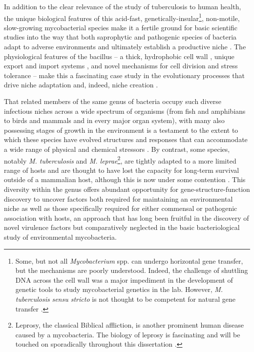 In addition to the clear relevance of the study of tuberculosis to human health, the unique biological features of this acid\hyp{}fast, genetically\hyp{}insular\footnote{Some, but not all \textit{Mycobacterium} spp. can undergo horizontal gene transfer, but the mechanisms are poorly understood. Indeed, the challenge of shuttling DNA across the cell wall was a major impediment in the development of genetic tools to study mycobacterial genetics in the lab. However, \textit{M. tuberculosis} \textit{sensu stricto} is not thought to be competent for natural gene transfer \citep{Madacki2021, Reva2015, Merker2015, Galagan2014, Boritsch2016, Derbyshire2014, Krzywinska2004}.}, non\hyp{}motile, slow\hyp{}growing mycobacterial species make it a fertile ground for basic scientific studies into the way that both saprophytic and pathogenic species of bacteria adapt to adverse environments and ultimately establish a productive niche \citep{Prasanthi2014, Falkinham2009, Ghodbane2014, Houben2006, Pieters2002, Delafont2014}. The physiological features of the bacillus -- a thick, hydrophobic cell wall \citep{Chatterjee1997, Jarlier1994, Jankute2015}, unique export and import systems \citep{Houben2014, Bunduc2020, Famelis2019, Pandey2008, Tullius2011, Braibant2000, Wong2017a, Palmer2017}, and novel mechanisms for cell division \citep{Hett2008, Odermatt2020, Dziadek2003, Kieser2014} and stress tolerance \citep{Garg2015, Peddireddy2017} -- make this a fascinating case study in the evolutionary processes that drive niche adaptation and, indeed, niche creation \citep{Lovewell2021, Honda2018, Lerner2016, Gengenbacher2012, Sarathy2020, Warner2007, Chapman1971, deChastellier2009, Gagneux2018, Pereira2020}. 

That related members of the same genus of bacteria occupy such diverse infectious niches across a wide spectrum of organisms (from fish and amphibians to birds and mammals and in every major organ system), with many also possessing stages of growth in the environment is a testament to the extent to which these species have evolved structures and responses that can accommodate a wide range of physical and chemical stressors \citep{Thoen1981, Palmer2011, Hershberg2016, Saelens2019, Larsen2020}. By contrast, some species, notably \textit{M. tuberculosis} and \textit{M. leprae}\footnote{Leprosy, the classical Biblical affliction, is another prominent human disease caused by a mycobacteria. The biology of leprosy is fascinating and will be touched on sporadically throughout this dissertation \citep{Schamberg1899}.}, are tightly adapted to a more limited range of hosts and are thought to have lost the capacity for long\hyp{}term survival outside of a mammalian host, although this is now under some contention \citep{Ploemacher2020, Borham2022, Martinez2019, Mtetwa2022}. This diversity within the genus offers abundant opportunity for gene\hyp{}structure\hyp{}function discovery to uncover factors both required for maintaining an environmental niche as well as those specifically required for either commensal or pathogenic association with hosts, an approach that has long been fruitful in the discovery of novel virulence factors \citep{Sassetti2003, Ehrt2015} but comparatively neglected in the basic bacteriological study of environmental mycobacteria.

